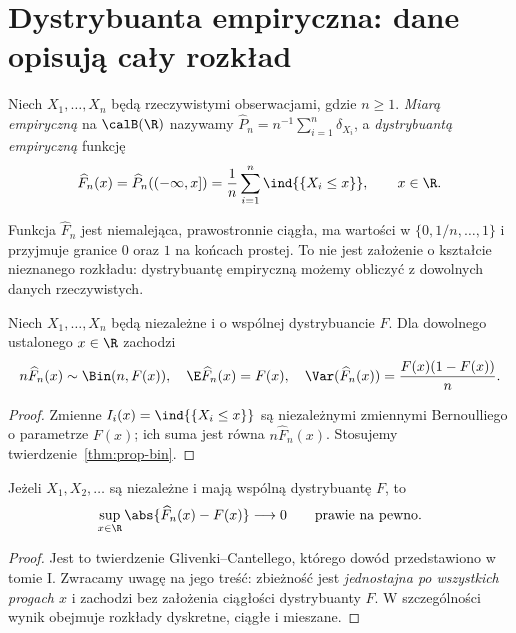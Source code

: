 \section{Dystrybuanta empiryczna: dane opisują cały rozkład}\label{sec:ecdf}
\begin{definicja}
Niech $X_1,\ldots,X_n$ będą rzeczywistymi obserwacjami, gdzie $n\ge1$. \emph{Miarą empiryczną} na $\calB(\R)$ nazywamy
$\widehat P_n=n^{-1}\sum_{i=1}^n\delta_{X_i}$, a \emph{dystrybuantą empiryczną} funkcję
\[
\widehat F_n(x)=\widehat P_n(( -\infty,x])=\frac1n\sum_{i=1}^n\ind{\{X_i\le x\}},\qquad x\in\R.
\]
\end{definicja}

Funkcja $\widehat F_n$ jest niemalejąca, prawostronnie ciągła, ma wartości w $\{0,1/n,\ldots,1\}$ i przyjmuje granice $0$ oraz $1$ na końcach prostej. To nie jest założenie o kształcie nieznanego rozkładu: dystrybuantę empiryczną możemy obliczyć z dowolnych danych rzeczywistych.

\begin{stwierdzenie}\label{prop:ecdf-pointwise}
Niech $X_1,\ldots,X_n$ będą niezależne i o wspólnej dystrybuancie $F$. Dla dowolnego ustalonego $x\in\R$ zachodzi
\[
n\widehat F_n(x)\sim\Bin(n,F(x)),\quad
\E\widehat F_n(x)=F(x),\quad
\Var(\widehat F_n(x))=\frac{F(x)(1-F(x))}{n}.
\]
\end{stwierdzenie}
\begin{proof}
Zmienne $I_i(x)=\ind{\{X_i\le x\}}$ są niezależnymi zmiennymi Bernoulliego o parametrze $F(x)$; ich suma jest równa $n\widehat F_n(x)$. Stosujemy twierdzenie~\ref{thm:prop-bin}.
\end{proof}

\begin{twierdzenie}\label{thm:gc}
Jeżeli $X_1,X_2,\ldots$ są niezależne i mają wspólną dystrybuantę $F$, to
\[
\sup_{x\in\R}\abs{\widehat F_n(x)-F(x)}\longrightarrow0
\qquad\text{prawie na pewno}.
\]
\end{twierdzenie}
\begin{proof}
Jest to twierdzenie Glivenki--Cantellego, którego dowód przedstawiono w tomie I. Zwracamy uwagę na jego treść: zbieżność jest \emph{jednostajna po wszystkich progach $x$} i zachodzi bez założenia ciągłości dystrybuanty $F$. W szczególności wynik obejmuje rozkłady dyskretne, ciągłe i mieszane.
\end{proof}

